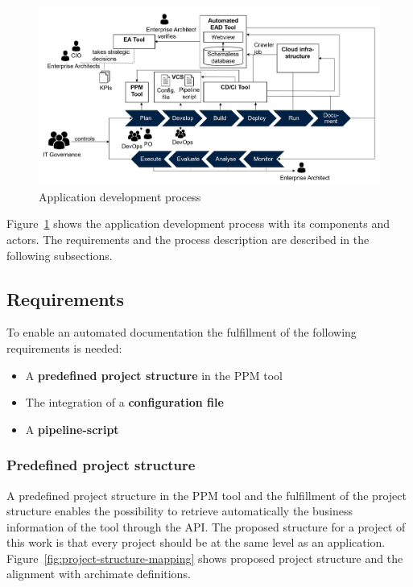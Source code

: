 \begin{figure}[htpb]
  \centering
  \includegraphics[width=1.0\textwidth]{figures/application-development-process.PNG}
  \caption{Application development process}
  \label{fig:application-development-process}
\end{figure}

Figure~\ref{fig:application-development-process} shows the application development process with its components and actors. The requirements and the process description are described in the following subsections.

\subsection{Requirements}\label{subsection:requirements}

To enable an automated documentation the fulfillment of the following requirements is needed:

\begin{itemize}
    \item A \textbf{predefined project structure} in the PPM tool
    \item The integration of a \textbf{configuration file}
    \item A \textbf{pipeline-script}
\end{itemize}
\subsubsection{Predefined project structure}

A predefined project structure in the PPM tool and the fulfillment of the project structure enables the possibility to retrieve automatically the business information of the tool through the API. 
%
The proposed structure for a project of this work is that every project should be at the same level as an application. Figure~\ref{fig:project-structure-mapping} shows proposed project structure and the alignment with archimate definitions.

